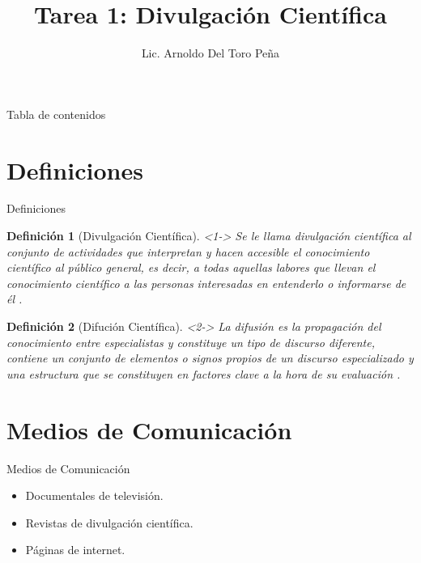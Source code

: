 \documentclass{beamer}
\title{Tarea 1: Divulgación Científica}
\author{Lic. Arnoldo Del Toro Peña }
\institute[UANL]{Universidad Autónoma de Nuevo León}
\newtheorem{definicion}{Definición}
\newcommand{\divul}{Divulgación Científica}
\newcommand{\difu}{Difución Científica}
\begin{document}
	
	\begin{frame}
		\titlepage
	\end{frame}
	
	\begin{frame}{Tabla de contenidos}
		\tableofcontents
	\end{frame}
	
	\section{Definiciones}
	
	\begin{frame}{Definiciones}
		\begin{definicion}[\divul]<1->
			Se le llama divulgación científica al conjunto de actividades que interpretan y hacen accesible el conocimiento científico al público general, es decir, a todas aquellas labores que llevan el conocimiento científico a las personas interesadas en entenderlo o informarse de él  \citep{fundora_divulgacion_2021}.
		\end{definicion}
	
		\begin{definicion}[\difu]<2->
			La difusión es la propagación del conocimiento entre especialistas y constituye un tipo de discurso diferente, contiene un conjunto de elementos o signos propios de un discurso especializado y una estructura que se constituyen en factores clave a la hora de su evaluación \citep{espinosa_santos_difusion_2010}.
		\end{definicion}
	
	\end{frame} 
	
	\section{Medios de Comunicación}
	
	\begin{frame}{Medios de Comunicación}
		\begin{itemize}
			\item Documentales de televisión. \citep{inti_cine_2021}
			\item Revistas de divulgación científica. \citep{diana_caracteristicas_2021}
			\item Páginas de internet. \citep{noauthor_investigacion_nodate}
		\end{itemize}
	\end{frame}

\end{document}
